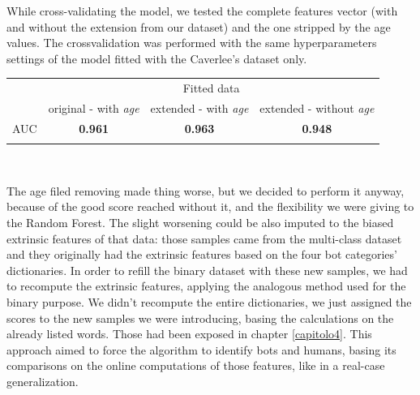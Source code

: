While cross-validating the model, we tested the complete features vector (with and without the extension from our dataset) and the one stripped by the age values. The crossvalidation was performed with the same hyperparameters settings of the model fitted with the Caverlee's dataset only.

{
	\centering
	\begin{tabular}{@{}cccc@{}}
		\multicolumn{1}{c}{} & 
		\multicolumn{3}{c}{Fitted data} \\ 
		\cline{2-4}
		\multicolumn{1}{c|}{} & 
		\multicolumn{1}{c|}{original - with \textit{age} } & 
		\multicolumn{1}{c|}{extended - with \textit{age} } & 
		\multicolumn{1}{c|}{extended - without \textit{age}} \\
		\cline{1-4}
		\multicolumn{1}{|c|}{AUC} & 
		\multicolumn{1}{c|}{\textbf{0.961}} & 
		\multicolumn{1}{c|}{\textbf{0.963}} & 
		\multicolumn{1}{c|}{\textbf{0.948}} \\
		\cline{1-4}\\
	\end{tabular}\\
}

The age filed removing made thing worse, but we decided to perform it anyway, because of the good score reached without it, and the flexibility we were giving to the Random Forest. The slight worsening could be also imputed to the biased extrinsic features of that data: those samples came from the multi-class dataset and they originally had the extrinsic features based on the four bot categories' dictionaries.
In order to refill the binary dataset with these new samples, we had to recompute the extrinsic features, applying the analogous method used for the binary purpose.
We didn't recompute the entire dictionaries, we just assigned the scores to the new samples we were introducing, basing the calculations on the already listed words. Those had been exposed in chapter \ref{capitolo4}. This approach aimed to force the algorithm to identify bots and humans, basing its comparisons on the online computations of those features, like in a real-case generalization.

